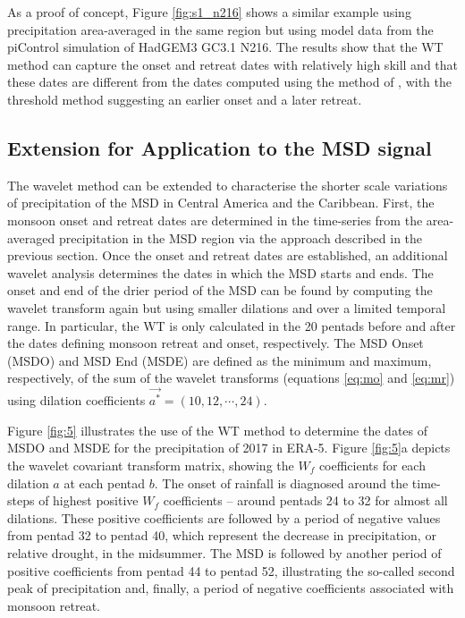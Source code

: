  As a proof of concept, Figure \ref{fig:s1_n216} shows a similar example using precipitation area-averaged in the same region but using model data from the piControl simulation of HadGEM3 GC3.1 N216. 
 The results show that the WT method can capture the onset and retreat dates with relatively high skill and that these dates are different from the dates computed using the method of , with the threshold method suggesting an earlier onset and a later retreat. 

\subsection{Extension for Application to the MSD signal}




The wavelet method can be extended to characterise the shorter scale variations of precipitation of the MSD in Central America and the Caribbean. First, the monsoon onset and retreat dates are determined in the time-series from the area-averaged precipitation in the MSD region via the approach described in the previous section. 
Once the onset and retreat dates are established, an additional wavelet analysis determines the dates in which the MSD starts and ends.
The onset and end of the drier period of the MSD can be found by computing the wavelet transform again but using smaller dilations and over a limited temporal range. In particular, the WT is only calculated in the 20 pentads before and after the dates defining monsoon retreat and onset, respectively. The MSD Onset (MSDO) and MSD End (MSDE) are defined as the minimum and maximum, respectively, of the sum of the wavelet transforms (equations \ref{eq:mo} and \ref{eq:mr}) using dilation coefficients $\vec{a^*} = (10,12,\cdots, 24)$.


Figure \ref{fig:5} illustrates the use of the WT method to determine the dates of MSDO and MSDE for the precipitation of 2017 in ERA-5.
Figure \ref{fig:5}a depicts the wavelet covariant transform matrix, showing the $W_f$ coefficients for each dilation $a$ at each pentad $b$. The onset of rainfall is diagnosed around the time-steps of highest positive $W_f$ coefficients -- around pentads 24 to 32 for almost all dilations. These positive coefficients are followed by a period of negative values from pentad 32 to pentad 40, which represent the decrease in precipitation, or relative drought, in the midsummer. The MSD is followed by another period of positive coefficients from pentad 44 to pentad 52, illustrating the so-called second peak of precipitation and, finally, a period of negative coefficients associated with monsoon retreat.

